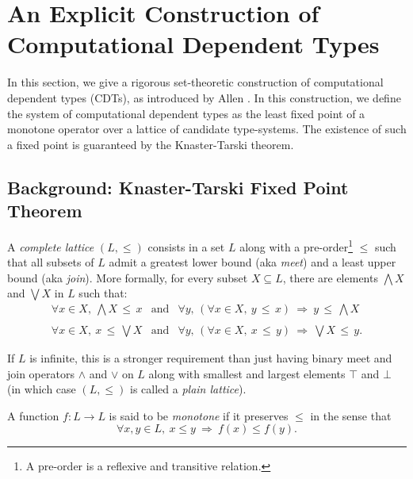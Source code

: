 \documentclass{article} \usepackage{chtt-notes} \usepackage{stmaryrd}
\newcommand{\meet}[1]{\bigwedge\!#1}
\newcommand{\join}[1]{\bigvee\!#1}
\begin{document}
\maketitle

\section{An Explicit Construction of Computational Dependent Types}

In this section, we give a rigorous set-theoretic construction of
computational dependent types (CDTs), as introduced by Allen
\cite{Allen:87}. In this construction, we define the system of
computational dependent types as the least fixed point of a monotone
operator over a lattice of candidate type-systems. The existence of
such a fixed point is guaranteed by the Knaster-Tarski theorem.

\subsection{Background: Knaster-Tarski Fixed Point Theorem}

A \emph{complete lattice} $(L, \leq)$ consists in a set $L$ along with
a pre-order\footnote{A pre-order is a reflexive and transitive
  relation.} $\leq$ such that all subsets of $L$ admit a greatest
lower bound (aka \emph{meet}) and a least upper bound (aka
\emph{join}).  More formally, for every subset $X \subseteq L$, there
are elements $\meet{X}$ and $\join{X}$ in $L$ such that:
\[\begin{array}{ccc}
    \forall x\in X, \ \meet{X} \,\leq\, x  &  \text{and}  &
    \forall y,\, \left( \forall x\in X, \ y \,\leq\, x  \right) \ \Longrightarrow \ 
    y \,\leq\, \meet{X} \\ \\
    \forall x\in X, \ x \,\leq\, \join{X}  & \text{and}  &
    \forall y,\, \left( \forall x\in X, \ x \,\leq\, y  \right) \ \Longrightarrow \ 
    \join{X} \,\leq\, y.
  \end{array}\]
\begin{remark*}
  If $L$ is infinite, this is a stronger requirement than just having
  binary meet and join operators $\wedge$ and $\vee$ on $L$ along with
  smallest and largest elements $\top$ and $\bot$ (in which case
  $(L, \leq)$ is called a \emph{plain lattice}).
\end{remark*}
A function $f : L \to L$ is said to be \emph{monotone} if it preserves
$\leq$ in the sense that
\[ \forall x, y \in L, \ x \leq y \ \Longrightarrow \ f(x) \leq
  f(y).\]
\end{document}
